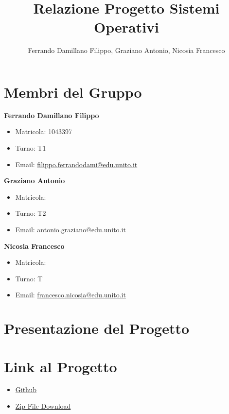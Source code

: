 \documentclass{article}
\title{Relazione Progetto Sistemi Operativi}
\author{Ferrando Damillano Filippo, Graziano Antonio, Nicosia Francesco}
\begin{document}
\maketitle

\tableofcontents

\section{Membri del Gruppo}

\textbf{Ferrando Damillano Filippo}
\begin{itemize}
    \item Matricola: 1043397
    \item Turno: T1    
    \item Email: \href{mailto:filippo.ferrandodami@edu.unito.it}{filippo.ferrandodami@edu.unito.it}
\end{itemize}
\textbf{Graziano Antonio}
\begin{itemize}
    \item Matricola:
    \item Turno: T2
    \item Email: \href{mailto:antonio.graziano@edu.unito.it}{antonio.graziano@edu.unito.it}     
\end{itemize}
\textbf{Nicosia Francesco}
\begin{itemize}
    \item Matricola: 
    \item Turno: T
    \item Email: \href{mailto:francesco.nicosia@edu.unito.it}{francesco.nicosia@edu.unito.it}
\end{itemize}

\section{Presentazione del Progetto}

\section{Link al Progetto}
    \begin{itemize}
        \item \href{https://github.com/filippo-ferrando/progetto-so}{Github}
        \item \href{https://github.com/filippo-ferrando/progetto-so/archive/refs/heads/main.zip}{Zip File Download}
    \end{itemize}
\end{document}
